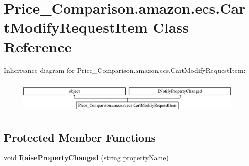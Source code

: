 \hypertarget{class_price___comparison_1_1amazon_1_1ecs_1_1_cart_modify_request_item}{\section{Price\-\_\-\-Comparison.\-amazon.\-ecs.\-Cart\-Modify\-Request\-Item Class Reference}
\label{class_price___comparison_1_1amazon_1_1ecs_1_1_cart_modify_request_item}
}


 


Inheritance diagram for Price\-\_\-\-Comparison.\-amazon.\-ecs.\-Cart\-Modify\-Request\-Item\-:\begin{figure}[H]
\begin{center}
\leavevmode
\includegraphics[height=1.707317cm]{class_price___comparison_1_1amazon_1_1ecs_1_1_cart_modify_request_item}
\end{center}
\end{figure}
\subsection*{Protected Member Functions}
\begin{DoxyCompactItemize}
\item 
\hypertarget{class_price___comparison_1_1amazon_1_1ecs_1_1_cart_modify_request_item_a7665dd1a8eb57458adaf151a0de0249b}{void {\bfseries Raise\-Property\-Changed} (string property\-Name)}\label{class_price___comparison_1_1amazon_1_1ecs_1_1_cart_modify_request_item_a7665dd1a8eb57458adaf151a0de0249b}

\end{DoxyCompactItemize}
